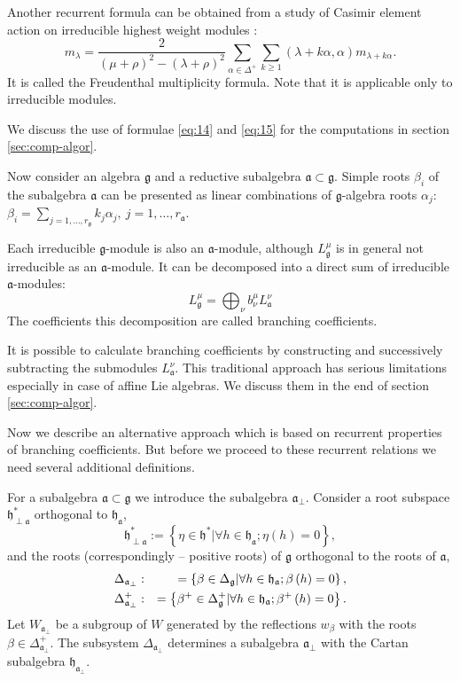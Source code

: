 \documentclass[preprint,12pt]{elsarticle}
\newcommand{\gf}{\mathfrak{g}}
\newcommand{\af}{\mathfrak{a}}
\newcommand{\afb}{\mathfrak{a}_{\bot}}
\newcommand{\hf}{\mathfrak{h}}
\begin{document}
Another recurrent formula can be obtained from a study of Casimir
element action on irreducible highest weight modules
\cite{humphreys1997introduction}:
\begin{equation}
  \label{eq:15}
  m_{\lambda}=\frac{2}{(\mu+\rho)^{2}-(\lambda+\rho)^{2}}\sum_{\alpha\in \Delta^{+}}\sum_{k\geq 1} (\lambda+k\alpha,\alpha)m_{\lambda+k\alpha}.
\end{equation}
It is called the Freudenthal multiplicity formula.
Note that it is applicable only to irreducible modules. 


We discuss the use of formulae \eqref{eq:14} and \eqref{eq:15} for the computations in section \ref{sec:comp-algor}. 

Now consider an algebra $\gf$ and a reductive subalgebra
$\af\subset \gf$. Simple roots $\beta_{i}$ of the subalgebra $\af$
can be presented as linear combinations of $\gf$-algebra roots
$\alpha_{j}$: $\beta_{i}=\sum_{j=1,\dots,r_{\gf}}k_{j}
\alpha_{j},\ j=1,\dots,r_{\af}$.

Each irreducible $\gf$-module is also an $\af$-module, although
$L^{\mu}_{\gf}$ is in general not irreducible as an $\af$-module. 
It can be
decomposed into a direct sum of irreducible $\af$-modules:
\begin{equation}
  \label{eq:16}
  L^{\mu}_{\gf}=\bigoplus_{\nu}b^{\mu}_{\nu}L^{\nu}_{\af}
\end{equation}
The coefficients this decomposition are called branching coefficients. 

It is possible to calculate branching coefficients by constructing and successively  subtracting the submodules $L^{\nu}_{\af}$. 
This traditional approach has serious limitations especially in case of affine Lie algebras. We discuss them in the end of section \ref{sec:comp-algor}. 

Now we describe an alternative approach which is based on recurrent properties of branching coefficients. 
But before we proceed to these recurrent relations we need several additional definitions.

For a subalgebra $\af\subset \gf$ we introduce the subalgebra
$\afb$. Consider a root subspace $\hf_{\perp \af}^{\ast }$
orthogonal to $\hf_{\af}$,
\begin{equation*}
\hf_{\perp \af}^{\ast }:=\left\{ \eta \in \hf^{\ast }|\forall
h\in \hf_{\af};\eta \left( h\right) =0\right\} ,
\end{equation*}
and the roots (correspondingly -- positive roots) of $\gf$ orthogonal
to the roots of $\af$,
\begin{eqnarray}
\Delta _{\afb} &:&=\left\{ \beta \in \Delta _{\gf}|\forall
h\in \hf_{\af};\beta \left( h\right) =0\right\} ,
\label{delta a ort} \\
\Delta _{\afb}^{+} &:&=\left\{ \beta ^{+}\in \Delta _{\gf%
}^{+}|\forall h\in \hf_{\af};\beta ^{+}\left( h\right) =0\right\} .
\notag
\end{eqnarray}
Let $W_{\afb}$ be a subgroup of $W$ generated by
the reflections $w_{\beta }$ with the roots $\beta \in \Delta _{\af_{\perp
}}^{+}$. The subsystem $\Delta _{\afb}$ determines a 
subalgebra $\afb$ with the Cartan subalgebra $\hf_{\af%
_{\perp }}$.
\end{document}
